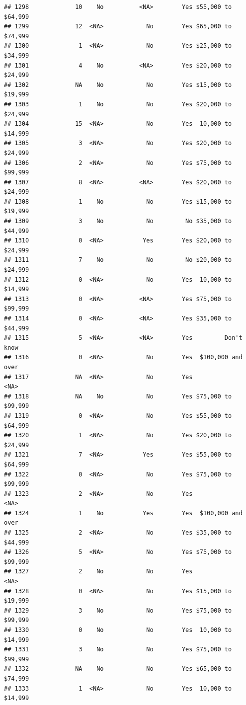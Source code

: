 \documentclass[man]{apa6}
\begin{document}
\begin{verbatim}
## 1298             10    No          <NA>        Yes $55,000 to $64,999
## 1299             12  <NA>            No        Yes $65,000 to $74,999
## 1300              1  <NA>            No        Yes $25,000 to $34,999
## 1301              4    No          <NA>        Yes $20,000 to $24,999
## 1302             NA    No            No        Yes $15,000 to $19,999
## 1303              1    No            No        Yes $20,000 to $24,999
## 1304             15  <NA>            No        Yes  10,000 to $14,999
## 1305              3  <NA>            No        Yes $20,000 to $24,999
## 1306              2  <NA>            No        Yes $75,000 to $99,999
## 1307              8  <NA>          <NA>        Yes $20,000 to $24,999
## 1308              1    No            No        Yes $15,000 to $19,999
## 1309              3    No            No         No $35,000 to $44,999
## 1310              0  <NA>           Yes        Yes $20,000 to $24,999
## 1311              7    No            No         No $20,000 to $24,999
## 1312              0  <NA>            No        Yes  10,000 to $14,999
## 1313              0  <NA>          <NA>        Yes $75,000 to $99,999
## 1314              0  <NA>          <NA>        Yes $35,000 to $44,999
## 1315              5  <NA>          <NA>        Yes         Don't know
## 1316              0  <NA>            No        Yes  $100,000 and over
## 1317             NA  <NA>            No        Yes               <NA>
## 1318             NA    No            No        Yes $75,000 to $99,999
## 1319              0  <NA>            No        Yes $55,000 to $64,999
## 1320              1  <NA>            No        Yes $20,000 to $24,999
## 1321              7  <NA>           Yes        Yes $55,000 to $64,999
## 1322              0  <NA>            No        Yes $75,000 to $99,999
## 1323              2  <NA>            No        Yes               <NA>
## 1324              1    No           Yes        Yes  $100,000 and over
## 1325              2  <NA>            No        Yes $35,000 to $44,999
## 1326              5  <NA>            No        Yes $75,000 to $99,999
## 1327              2    No            No        Yes               <NA>
## 1328              0  <NA>            No        Yes $15,000 to $19,999
## 1329              3    No            No        Yes $75,000 to $99,999
## 1330              0    No            No        Yes  10,000 to $14,999
## 1331              3    No            No        Yes $75,000 to $99,999
## 1332             NA    No            No        Yes $65,000 to $74,999
## 1333              1  <NA>            No        Yes  10,000 to $14,999

\end{verbatim}
\end{document}
